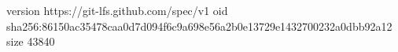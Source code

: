version https://git-lfs.github.com/spec/v1
oid sha256:86150ac35478caa0d7d094f6c9a698e56a2b0e13729e1432700232a0dbb92a12
size 43840
